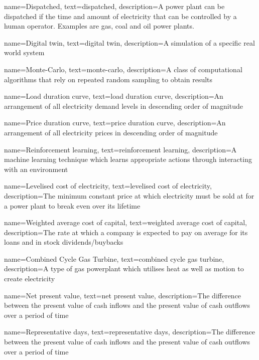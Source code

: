 {
	name=Dispatched,
	text=dispatched,
	description={A power plant can be dispatched if the time and amount of electricity that can be controlled by a human operator. Examples are gas, coal and oil power plants.}
}

{
	name=Digital twin,
	text=digital twin,
	description={A simulation of a specific real world system}
}


{
	name=Monte-Carlo,
	text=monte-carlo,
	description={A class of computational algorithms that rely on repeated random sampling to obtain results}
}



{
	name=Load duration curve,
	text=load duration curve,
	description={An arrangement of all electricity demand levels in descending order of magnitude}
}




{
	name=Price duration curve,
	text=price duration curve,
	description={An arrangement of all electricity prices in descending order of magnitude}
}


{
	name=Reinforcement learning,
	text=reinforcement learning,
	description={A machine learning technique which learns appropriate actions through interacting with an environment}
}



{
	name=Levelised cost of electricity,
	text=levelised cost of electricity,
	description={The minimum constant price at which electricity must be sold at for a power plant to break even over its lifetime}
}



{
	name=Weighted average cost of capital,
	text=weighted average cost of capital,
	description={The rate at which a company is expected to pay on average for its loans and in stock dividends/buybacks}
}


{
	name=Combined Cycle Gas Turbine,
	text=combined cycle gas turbine,
	description={A type of gas powerplant which utilises heat as well as motion to create electricity}
}



{
	name=Net present value,
	text=net present value,
	description={The difference between the present value of cash inflows and the present value of cash outflows over a period of time}
}


{
	name=Representative days,
	text=representative days,
	description={The difference between the present value of cash inflows and the present value of cash outflows over a period of time}
}


